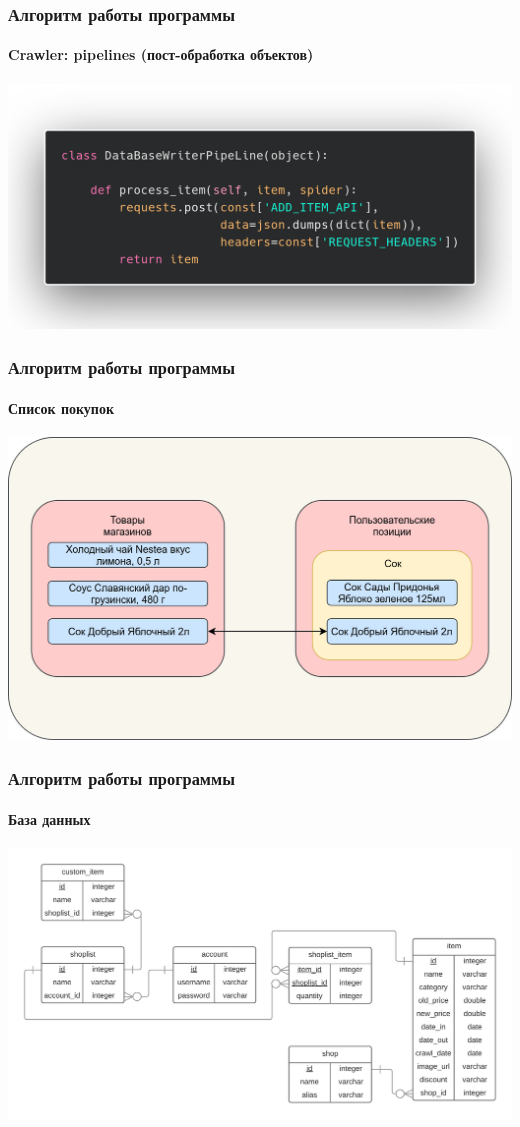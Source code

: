 \documentclass{beamer}
\begin{document}
\begin{frame}
    \frametitle{Алгоритм работы программы}
    \framesubtitle{Crawler: pipelines (пост-обработка объектов)}
    \begin{center}
        \includegraphics[width=0.9\columnwidth]{code_pipeline.png}
    \end{center}
\end{frame}

\begin{frame}
    \frametitle{Алгоритм работы программы}
    \framesubtitle{Список покупок}
    \medskip
    \begin{center}
      \includegraphics[width=\linewidth]{shoplist}
    \end{center}
\end{frame}

\begin{frame}
    \frametitle{Алгоритм работы программы}
    \framesubtitle{База данных}
    \medskip
    \begin{center}
      \includegraphics[width=\linewidth]{database}
    \end{center}
\end{frame}
\end{document}
